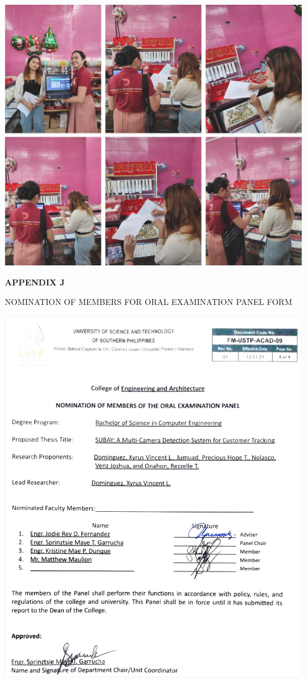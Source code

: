 \begin{center}
	\includegraphics[width=1\textwidth]{app/I.pdf}
\end{center}

\clearpage

\begin{center}
	{\bf APPENDIX J}
\end{center}

\begin{center}
	NOMINATION OF MEMBERS FOR ORAL EXAMINATION PANEL FORM
\end{center}

\begin{center}
	\includegraphics[width=1\textwidth]{app/L.pdf}
\end{center}

